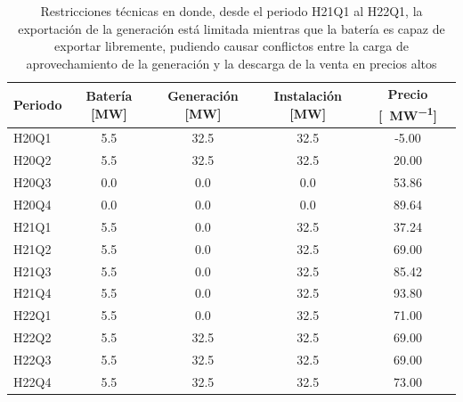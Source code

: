 \begin{table}[ht]
  \centering
  \begin{tabular}{|l|S[table-format=4.1]|S[table-format=4.1]|S[table-format=4.1]|S[table-format=4.2]|}
    \hline
    Periodo & {Batería [\si{\mega\watt}]}  & {Generación [\si{\mega\watt}]}  & {Instalación [\si{\mega\watt}]}  & {Precio [\si{\text{\euro}\per\mega\watt}]} \\
    \hline
    H20Q1   & 5.5                          & 32.5                            & 32.5                             & -5.00                                      \\
    H20Q2   & 5.5                          & 32.5                            & 32.5                             & 20.00                                      \\
    H20Q3   & 0.0                          & 0.0                             & 0.0                              & 53.86                                      \\
    H20Q4   & 0.0                          & 0.0                             & 0.0                              & 89.64                                      \\
    H21Q1   & 5.5                          & 0.0                             & 32.5                             & 37.24                                      \\
    H21Q2   & 5.5                          & 0.0                             & 32.5                             & 69.00                                      \\
    H21Q3   & 5.5                          & 0.0                             & 32.5                             & 85.42                                      \\
    H21Q4   & 5.5                          & 0.0                             & 32.5                             & 93.80                                      \\
    H22Q1   & 5.5                          & 0.0                             & 32.5                             & 71.00                                      \\
    H22Q2   & 5.5                          & 32.5                            & 32.5                             & 69.00                                      \\
    H22Q3   & 5.5                          & 32.5                            & 32.5                             & 69.00                                      \\
    H22Q4   & 5.5                          & 32.5                            & 32.5                             & 73.00                                      \\
    \hline
  \end{tabular}
  \caption{Restricciones técnicas en donde, desde el periodo H21Q1 al H22Q1, la exportación de la generación está limitada mientras que la batería es capaz de exportar libremente, pudiendo causar conflictos entre la carga de aprovechamiento de la generación y la descarga de la venta en precios altos}
  \label{tab:carga-descarga-simultanea}
\end{table}

